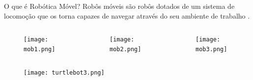 \begin{frame}[t]{O que é Robótica Móvel?}
  \transboxout[duration=0.5]
  Robôs móveis são robôs dotados de um sistema de locomoção que os torna capazes de navegar através do seu ambiente de trabalho \cite{robmovel}.

  \begin{columns}[c]
      \begin{center}
        \begin{figure}
          \texttt{[image: mob1.png]}  
        \end{figure}
      \end{center}      
      \begin{center}
        \begin{figure}
          \texttt{[image: mob2.png]}  
        \end{figure}
      \end{center}      
      \begin{center}
        \begin{figure}
          \texttt{[image: mob3.png]}  
        \end{figure}
      \end{center}
  \end{columns}
\end{frame}

\begin{frame}
  \begin{center}
    \begin{figure}
      \texttt{[image: turtlebot3.png]}  
    \end{figure}
  \end{center}
\end{frame}
